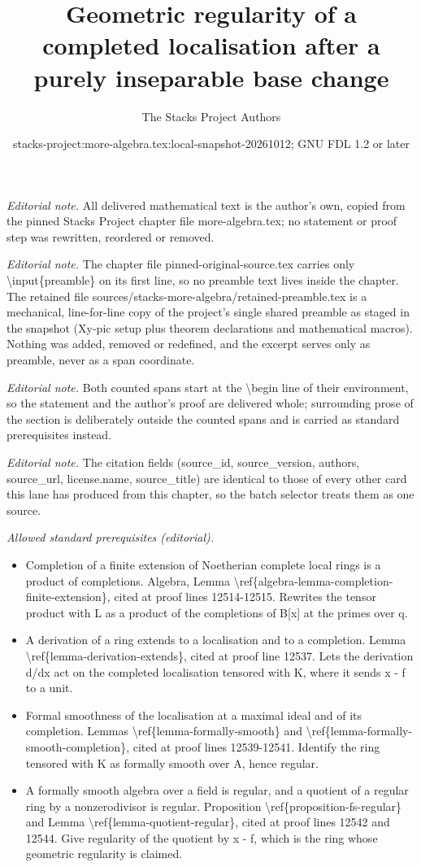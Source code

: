 \documentclass[10pt,a4paper]{amsart}
\title{Geometric regularity of a completed localisation after a purely inseparable base change}
\author{The Stacks Project Authors}
\date{stacks-project:more-algebra.tex:local-snapshot-20261012; GNU FDL 1.2 or later}
\theoremstyle{plain}
\theoremstyle{definition}
\theoremstyle{remark}
\numberwithin{equation}{subsection}
\begin{document}
\maketitle
\setcounter{subsection}{1}
\noindent\textit{Editorial note.} All delivered mathematical text is the author's own, copied from the pinned Stacks Project chapter file more-algebra.tex; no statement or proof step was rewritten, reordered or removed.\par\medskip
\noindent\textit{Editorial note.} The chapter file pinned-original-source.tex carries only \textbackslash{}input\{preamble\} on its first line, so no preamble text lives inside the chapter. The retained file sources/stacks-more-algebra/retained-preamble.tex is a mechanical, line-for-line copy of the project's single shared preamble as staged in the snapshot (Xy-pic setup plus theorem declarations and mathematical macros). Nothing was added, removed or redefined, and the excerpt serves only as preamble, never as a span coordinate.\par\medskip
\noindent\textit{Editorial note.} Both counted spans start at the \textbackslash{}begin line of their environment, so the statement and the author's proof are delivered whole; surrounding prose of the section is deliberately outside the counted spans and is carried as standard prerequisites instead.\par\medskip
\noindent\textit{Editorial note.} The citation fields (source\_id, source\_version, authors, source\_url, license.name, source\_title) are identical to those of every other card this lane has produced from this chapter, so the batch selector treats them as one source.\par\medskip
\noindent\textit{Allowed standard prerequisites (editorial).}\begin{itemize}
\item Completion of a finite extension of Noetherian complete local rings is a product of completions. Algebra, Lemma \textbackslash{}ref\{algebra-lemma-completion-finite-extension\}, cited at proof lines 12514-12515. Rewrites the tensor product with L as a product of the completions of B[x] at the primes over q.
\item A derivation of a ring extends to a localisation and to a completion. Lemma \textbackslash{}ref\{lemma-derivation-extends\}, cited at proof line 12537. Lets the derivation d/dx act on the completed localisation tensored with K, where it sends x - f to a unit.
\item Formal smoothness of the localisation at a maximal ideal and of its completion. Lemmas \textbackslash{}ref\{lemma-formally-smooth\} and \textbackslash{}ref\{lemma-formally-smooth-completion\}, cited at proof lines 12539-12541. Identify the ring tensored with K as formally smooth over A, hence regular.
\item A formally smooth algebra over a field is regular, and a quotient of a regular ring by a nonzerodivisor is regular. Proposition \textbackslash{}ref\{proposition-fs-regular\} and Lemma \textbackslash{}ref\{lemma-quotient-regular\}, cited at proof lines 12542 and 12544. Give regularity of the quotient by x - f, which is the ring whose geometric regularity is claimed.
\end{itemize}\medskip
\end{document}
